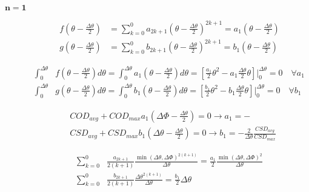 \documentclass[review]{elsarticle}
\begin{document}
\begin{description}
\item[$\mathbf{n=1}$]

\begin{equation}
\begin{aligned}
f\left(\theta-\frac{\Delta\theta}{2}\right)&=\sum_{k=0}^{0}a_{2k+1}\left(\theta-\frac{\Delta\theta}{2}\right)^{2k+1}=a_{1}\left(\theta-\frac{\Delta\theta}{2}\right)\\
g\left(\theta-\frac{\Delta\theta}{2}\right)&=\sum_{k=0}^{0}b_{2k+1}\left(\theta-\frac{\Delta\theta}{2}\right)^{2k+1}=b_{1}\left(\theta-\frac{\Delta\theta}{2}\right)
\end{aligned}
\end{equation}

\begin{equation}
\begin{aligned}
\int_{0}^{\Delta\theta}&f\left(\theta-\frac{\Delta\theta}{2}\right)d\theta=\int_{0}^{\Delta\theta}a_{1}\left(\theta-\frac{\Delta\theta}{2}\right) d\theta=\left[\frac{a_{1}}{2}\theta^{2}-a_{1}\frac{\Delta\theta}{2}\theta\right]\Bigg\rvert_{0}^{\Delta\theta}=0\quad\forall a_{1}\\
\int_{0}^{\Delta\theta}&g\left(\theta-\frac{\Delta\theta}{2}\right)d\theta=\int_{0}^{\Delta\theta}b_{1}\left(\theta-\frac{\Delta\theta}{2}\right) d\theta=\left[\frac{b_{1}}{2}\theta^{2}-b_{1}\frac{\Delta\theta}{2}\theta\right]\Bigg\rvert_{0}^{\Delta\theta}=0\quad\forall b_{1}
\end{aligned}
\end{equation}

\begin{equation}
\begin{aligned}
&COD_{avg}+COD_{max}a_{1}\left(\Delta\Phi-\frac{\Delta\theta}{2}\right)=0\rightarrow a_{1}=-\\
&CSD_{avg}+CSD_{max}b_{1}\left(\Delta\theta-\frac{\Delta\theta}{2}\right)=0\rightarrow b_{1}=-\frac{2}{\Delta\theta}\frac{CSD_{avg}}{CSD_{max}}
\end{aligned}
\end{equation}

\begin{equation}
\begin{aligned}
\sum_{k=0}^{0}&\frac{a_{2k+1}}{2\left(k+1\right)}\frac{\min\left(\Delta\theta,\Delta\Phi\right)^{2\left(k+1\right)}}{\Delta\theta}=\frac{a_{1}}{2}\frac{\min\left(\Delta\theta,\Delta\Phi\right)^{2}}{\Delta\theta}\\
\sum_{k=0}^{0}&\frac{b_{2k+1}}{2\left(k+1\right)}\frac{\Delta\theta^{2\left(k+1\right)}}{\Delta\theta}=\frac{b_{1}}{2}\Delta\theta
\end{aligned}
\end{equation}


\end{description}
\end{document}
